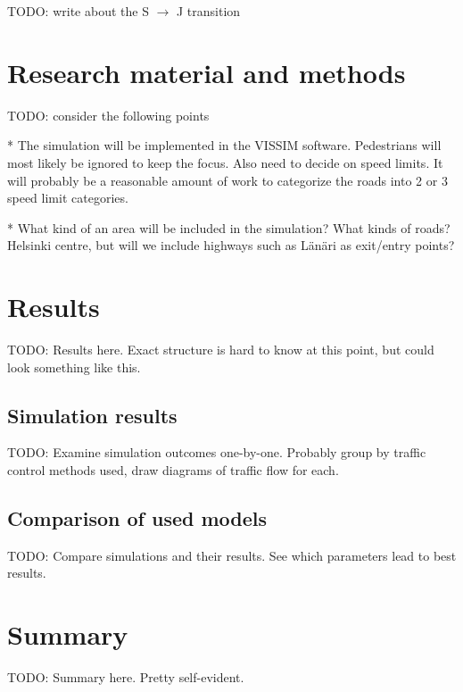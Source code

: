 \documentclass[english, 12pt, a4paper, elec, utf8, pdfa, online]{aaltothesis}
\begin{document}
TODO: write about the S $\to$ J transition

\clearpage

\section{Research material and methods}

TODO: consider the following points

* The simulation will be implemented in the VISSIM software. Pedestrians will most likely be ignored to keep the focus. Also need to decide on speed limits. It will probably be a reasonable amount of work to categorize the roads into 2 or 3 speed limit categories.

* What kind of an area will be included in the simulation? What kinds of roads? Helsinki centre, but will we include highways such as Länäri as exit/entry points?

\clearpage

\section{Results}

TODO: Results here. Exact structure is hard to know at this point, but could look something like this.

\subsection{Simulation results}

TODO: Examine simulation outcomes one-by-one. Probably group by traffic control methods used, draw diagrams of traffic flow for each.

\subsection{Comparison of used models}

TODO: Compare simulations and their results. See which parameters lead to best results.

\clearpage

\section{Summary}

TODO: Summary here. Pretty self-evident.

\clearpage

\thesisbibliography

{}


\clearpage

\thesisappendix
\end{document}

